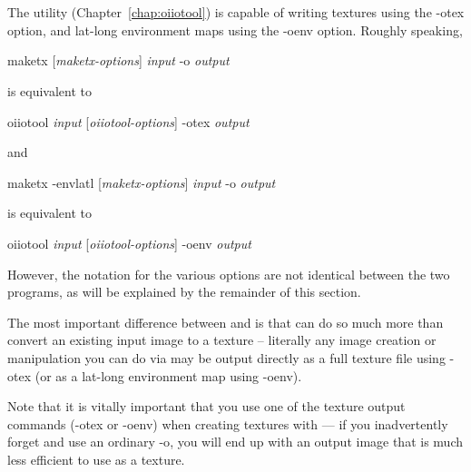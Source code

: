 \newpage
\section{\oiiotool}
\label{sec:oiiotooltex}

The \oiiotool utility (Chapter~\ref{chap:oiiotool}) is capable of writing
textures using the {\cf -otex} option, and lat-long environment maps using
the {\cf -oenv} option. Roughly speaking,

\medskip

\hspace{0.25in} {\cf maketx} [\emph{maketx-options}] \emph{input} {\cf -o} \emph{output}

\medskip

\noindent is equivalent to

\medskip

\hspace{0.25in} {\cf oiiotool} \emph{input} [\emph{oiiotool-options}] {\cf -otex} \emph{output}

\medskip

\noindent and

\medskip

\hspace{0.25in} {\cf maketx -envlatl} [\emph{maketx-options}] \emph{input} {\cf -o} \emph{output}

\medskip

\noindent is equivalent to

\medskip

\hspace{0.25in} {\cf oiiotool} \emph{input} [\emph{oiiotool-options}] {\cf -oenv} \emph{output}

\medskip

\noindent However, the notation for the various options are not identical
between the two programs, as will be explained by the remainder of this
section.

The most important difference between \oiiotool and \maketx is that
\oiiotool can do so much more than convert an existing input image to a
texture -- literally any image creation or manipulation you can do via
\oiiotool may be output directly as a full texture file using {\cf -otex}
(or as a lat-long environment map using {\cf -oenv}).

Note that it is vitally important that you use one of the texture output
commands ({\cf -otex} or {\cf -oenv}) when creating textures with \oiiotool
--- if you inadvertently forget and use an ordinary {\cf -o}, you will end
up with an output image that is much less efficient to use as a texture.

